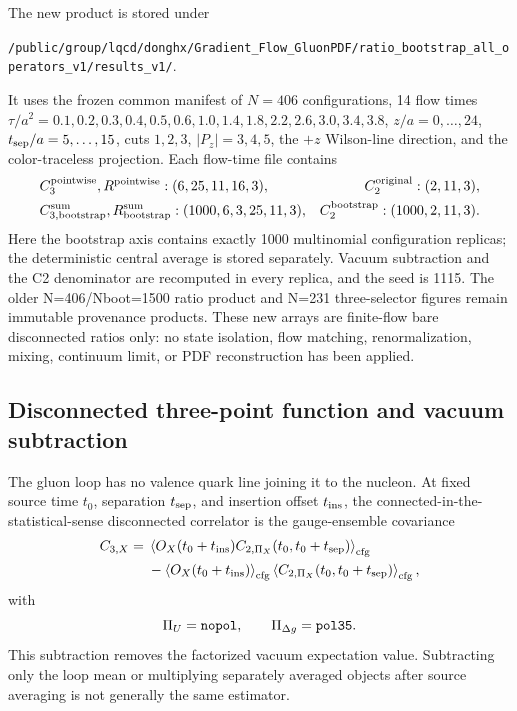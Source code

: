 \documentclass[11pt]{article}
\numberwithin{equation}{section}
\begin{document}
The new product is stored under
\begin{center}
\nolinkurl{/public/group/lqcd/donghx/Gradient_Flow_GluonPDF/ratio_bootstrap_all_operators_v1/results_v1/}.
\end{center}
It uses the frozen common manifest of $N=406$ configurations, 14 flow times
$\tau/a^2=0.1,0.2,0.3,0.4,0.5,0.6,1.0,1.4,1.8,2.2,2.6,3.0,3.4,3.8$,
$z/a=0,\ldots,24$, $t_{\rm sep}/a=5,\ldots,15$, cuts $1,2,3$,
$|P_z|=3,4,5$, the $+z$ Wilson-line direction, and the color-traceless
projection.  Each flow-time file contains
\begin{align}
 &C_3^{\rm pointwise},R^{\rm pointwise}:(6,25,11,16,3),
 &C_2^{\rm original}:(2,11,3),\\
 &C_{3,\rm bootstrap}^{\rm sum},R_{\rm bootstrap}^{\rm sum}
   :(1000,6,3,25,11,3),
 &C_2^{\rm bootstrap}:(1000,2,11,3).
\end{align}
Here the bootstrap axis contains exactly 1000 multinomial configuration
replicas; the deterministic central average is stored separately.  Vacuum
subtraction and the C2 denominator are recomputed in every replica, and the
seed is 1115.  The older N=406/Nboot=1500 ratio product and N=231 three-selector figures remain immutable
provenance products.  These new arrays are finite-flow bare disconnected
ratios only: no state isolation, flow matching, renormalization, mixing,
continuum limit, or PDF reconstruction has been applied.

\subsection{Disconnected three-point function and vacuum subtraction}

The gluon loop has no valence quark line joining it to the nucleon.  At fixed
source time \(t_0\), separation \(t_{\rm sep}\), and insertion offset
\(t_{\rm ins}\), the connected-in-the-statistical-sense disconnected
correlator is the gauge-ensemble covariance
\begin{align}
 C_{3,X}
 ={}&\left\langle
  O_X(t_0+t_{\rm ins})C_{2,\Pi_X}(t_0,t_0+t_{\rm sep})
 \right\rangle_{\rm cfg}\nonumber\\
 &-\left\langle O_X(t_0+t_{\rm ins})\right\rangle_{\rm cfg}
  \left\langle C_{2,\Pi_X}(t_0,t_0+t_{\rm sep})
  \right\rangle_{\rm cfg},
 \label{eq:flowed-gluon-disconnected-c3}
\end{align}
with
\begin{equation}
  \Pi_U={\tt nopol},
  \qquad
  \Pi_{\Delta g}={\tt pol35}.
  \label{eq:gluon-numerator-projectors}
\end{equation}
This subtraction removes the factorized vacuum expectation value.  Subtracting
only the loop mean or multiplying separately averaged objects after source
averaging is not generally the same estimator.
\end{document}
